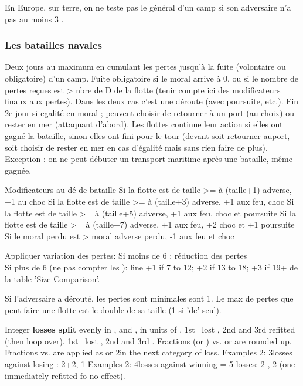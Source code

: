 En Europe, sur terre, on ne teste pas le général d'un camp si son adversaire
n'a pas au moins 3 \LD.

\subsubsection{Les batailles navales}
\aparag Deux jours au maximum en cumulant les pertes jusqu'à la fuite (volontaire
ou obligatoire) d'un camp.
\bparag Fuite obligatoire
       si le moral arrive à 0, ou
       si le nombre de pertes reçues est > nbre de D de la flotte
               (tenir compte ici des modificateurs finaux aux pertes).
     Dans les deux cas c'est une déroute (avec poursuite, etc.).
\bparag Fin 2e jour si egalité en moral ;
peuvent choisir de retourner à un port (au choix) ou rester en mer (attaquant
d'abord).
\bparag Les flottes continue leur action si elles ont gagné la bataille, sinon
elles ont fini pour le tour (devant soit retourner auport, soit choisir de rester en mer
en cas d'égalité mais sans rien faire de plus).
Exception : on ne peut débuter un transport maritime après une bataille, même gagnée.

 Modificateurs au dé de bataille
\bparag Si la flotte est de taille >= à (taille+1) adverse, +1 au choc
\bparag Si la flotte est de taille >= à (taille+3) adverse, +1 aux feu, choc
\bparag Si la flotte est de taille >= à (taille+5) adverse, +1 aux feu, choc et poursuite
\bparag Si la flotte est de taille >= à (taille+7) adverse, +1 aux feu,  +2 choc et +1 poursuite
\bparag Si le moral perdu est > moral adverse perdu, -1 aux feu et choc

Appliquer variation des pertes:
\bparag Si moins de 6 \ND : réduction des pertes \\
Si plus de 6 \ND (ne pas compter les \NDE):
line +1 if 7 to 12\DN; +2 if 13 to 18\DN; +3 if 19+\DN
de la table 'Size Comparison'.

\bparag Si l'adversaire a dérouté, les pertes sont minimales sont 1.
\bparag Le max de pertes que peut faire une flotte est le double de sa taille
       (1 si 'de' seul).


\bparag  Integer {\bf losses split} evenly in ,  and , in units of \ND.
 1st \ND\ lost  , 2nd  and 3rd refitted (then loop over).
 1st \ND\ lost  , 2nd  and 3rd .
\bparag Fractions (\tu or \td) vs. \NGD or \NTD are  rounded up. Fractions vs. \ND are applied as \NDE or 2\NDE  in the next category of loss.
\bparag Examples 2: 3\td losses against losing \ND: 2\ND+2, 1 \bparag Examples 2: 4\tu losses against winning \NGD = 5 losses: 2  , 2  (one immediately refitted fo no effect).


